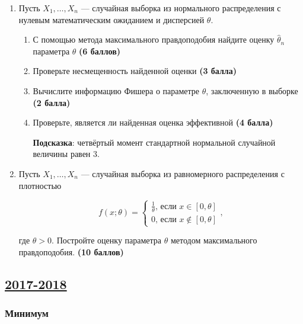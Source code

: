 \begin{enumerate}[resume]
\item Пусть $X_{1}, \ldots, X_{n}$ — случайная выборка из нормального распределения с нулевым математическим ожиданием и дисперсией $\theta$.

\begin{enumerate}
\item С помощью метода максимального правдоподобия найдите оценку $\hat{\theta}_{n}$ параметра $\theta$ \textbf{(6 баллов)}
\item Проверьте несмещенность найденной оценки \textbf{(3 балла)}
\item Вычислите информацию Фишера о параметре $\theta$, заключенную в выборке \textbf{(2 балла)}
\item Проверьте, является ли найденная оценка эффективной \textbf{(4 балла)}

\textbf{Подсказка}: четвёртый момент стандартной нормальной случайной величины равен 3.
\end{enumerate}

\item Пусть $X_{1}, \ldots, X_{n}$ — случайная выборка из равномерного распределения с плотностью


\[
f(x;\theta)=\begin{cases}\frac{1}{\theta}\text{, если }x\in[0,\theta]\\ 0\text{, если }x\notin[0,\theta]\end{cases},
\]

где $\theta>0$. Постройте оценку параметра $\theta$ методом максимального правдоподобия. \textbf{(10 баллов)}

\end{enumerate}



\subsection[2017-2018]{\hyperref[sec:sol_kr_03_2017_2018]{2017-2018}}
\label{sec:kr_03_2017_2018}

\subsubsection*{Минимум}

